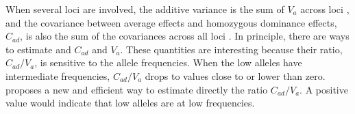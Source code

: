 \documentclass[a4paper,12pt]{article}
\begin{document}
When several loci are involved, the additive variance is the sum of $V_a$ across loci \citep[p. 129]{Falconer1989}, and the covariance between average effects and homozygous dominance effects, $C_{ad}$, is also the sum of the covariances across all loci \citep{Cockerham1984}. In principle, there are ways to estimate and $C_{ad}$ and $V_a$. These quantities are interesting because their ratio, $C_{ad}/V_a$, is sensitive to the allele frequencies. When the low alleles have intermediate frequencies, $C_{ad}/V_a$ drops to values close to or lower than zero. \citet{Kelly1999} proposes a new and efficient way to estimate directly the ratio $C_{ad}/V_a$. A positive value would indicate that low alleles are at low frequencies. %






\end{document}
